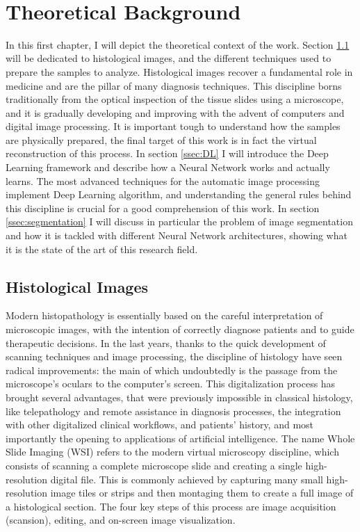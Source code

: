 \documentclass[12pt,a4paper]{report}
\begin{document}
    \newpage \ \newpage

    \chapter{Theoretical Background}
        In this first chapter, I will depict the theoretical context of the work. Section \ref{ssec:hist_im} will be dedicated to histological images, and the different techniques used to prepare the samples to analyze. Histological images recover a fundamental role in medicine and are the pillar of many diagnosis techniques. This discipline borns traditionally from the optical inspection of the tissue slides using a microscope, and it is gradually developing and improving with the advent of computers and digital image processing. It is important tough to understand how the samples are physically prepared, the final target of this work is in fact the virtual reconstruction of this process. In section \ref{ssec:DL} I will introduce the Deep Learning framework and describe how a Neural Network works and actually learns. The most advanced techniques for the automatic image processing implement Deep Learning algorithm, and understanding the general rules behind this discipline is crucial for a good comprehension of this work. In section \ref{ssec:segmentation} I will discuss in particular the problem of image segmentation and how it is tackled with different Neural Network architectures, showing what it is the state of the art of this research field.

        \section{Histological Images} \label{ssec:hist_im}

Modern histopathology is essentially based on the careful interpretation of microscopic images, with the intention of correctly diagnose patients and to guide therapeutic decisions. In the last years, thanks to the quick development of scanning techniques and image processing, the discipline of histology have seen radical improvements: the main of which undoubtedly is the passage from the microscope's oculars to the computer's screen. This digitalization process has brought several advantages, that were previously impossible in classical histology, like telepathology and remote assistance in diagnosis processes, the integration with other digitalized clinical workflows, and patients' history, and most importantly the opening to applications of artificial intelligence.
The name Whole Slide Imaging (WSI) refers to the modern virtual microscopy discipline, which consists of scanning a complete microscope slide and creating a single high-resolution digital file. This is commonly achieved by capturing many small high-resolution image tiles or strips and then montaging them to create a full image of a histological section. The four key steps of this process are image acquisition (scansion), editing, and on-screen image visualization.
\end{document}
